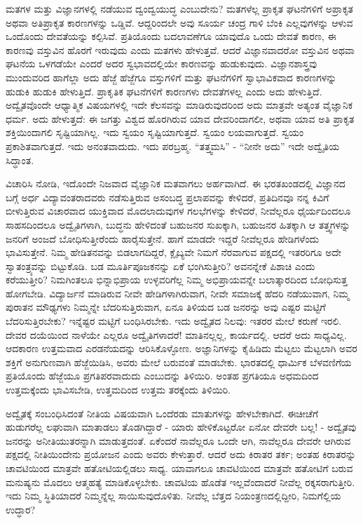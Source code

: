 ಮತಗಳ ಮತ್ತು ವಿಜ್ಞಾನಗಳಲ್ಲಿ ನಡೆಯುವ ದ್ವಂದ್ವಯುದ್ಧ ಎಂಬುದೇನು? ಮತಗಳೆಲ್ಲ ಪ್ರಾಕೃತ ಘಟನೆಗಳಿಗೆ ಅಪ್ರಾಕೃತ ಅಥವಾ ಅತಿಪ್ರಾಕೃತ ಕಾರಣಗಳನ್ನು ಒಡ್ಡಿವೆ. ಆದ್ದರಿಂದಲೇ ಅವು ಸೂರ್ಯ ಚಂದ್ರ ಗಾಳಿ ಬೆಂಕಿ ಎಲ್ಲವುಗಳನ್ನು ಆಳುವ ಒಂದೊಂದು ದೇವತೆಯನ್ನು ಕಲ್ಪಿಸಿವೆ. ಪ್ರತಿಯೊಂದು ಬದಲಾವಣೆಗೂ ಯಾವುದೊ ಒಂದು ದೇವತೆ ಕಾರಣ, ಈ ಕಾರಣವು ವಸ್ತುವಿನ ಹೊರಗೆ ಇರುವುದು ಎಂದು ಮತಗಳು ಹೇಳುತ್ತವೆ. ಆದರೆ ವಿಜ್ಞಾನವಾದರೋ ವಸ್ತುವಿನ ಅಥವಾ ಘಟನೆಯ ಒಳಗಡೆಯೇ ಎಂದರೆ ಅದರ ಸ್ವಭಾವದಲ್ಲಿಯೇ ಕಾರಣವನ್ನು ಹುಡುಕುವುದು. ವಿಜ್ಞಾನಶಾಸ್ತ್ರವು ಮುಂದುವರಿದ ಹಾಗೆಲ್ಲಾ ಅದು ಹೆಜ್ಜೆ ಹೆಜ್ಜೆಗೂ ವಸ್ತುಗಳಿಗೆ ಮತ್ತು ಘಟನೆಗಳಿಗೆ ಸ್ವಾಭಾವಿಕವಾದ ಕಾರಣಗಳನ್ನು ಹುಡುಕಿ ಹುಡುಕಿ ಹೇಳುತ್ತಿದೆ. ಪ್ರಾಕೃತಿಕ ಘಟನೆಗಳಿಗೆ ಕಾರಣಗಳು ದೇವತೆಗಳಲ್ಲ ಎಂದು ಅದು ಹೇಳುತ್ತಿದೆ. ಅದ್ವೈತವೊಂದೇ ಆಧ್ಯಾತ್ಮಿಕ ವಿಷಯಗಳಲ್ಲಿ ಇದೇ ಕೆಲಸವನ್ನು ಮಾಡಿರುವುದರಿಂದ ಅದು ಮಾತ್ರವೇ ಅತ್ಯಂತ ವೈಜ್ಞಾನಿಕ ಧರ್ಮ. ಅದು ಹೇಳುತ್ತದೆ: ಈ ಜಗತ್ತು ವಿಶ್ವದ ಹೊರಗಿರುವ ಯಾವ ದೇವರಿಂದಾಗಲೀ, ಅಥವಾ ಯಾವ ಅತಿ ಪ್ರಾಕೃತ ಶಕ್ತಿಯಿಂದಾಗಲಿ ಸೃಷ್ಟಿಯಾಗಿಲ್ಲ. ಇದು ಸ್ವಯಂ ಸೃಷ್ಟಿಯಾಗುತ್ತದೆ. ಸ್ವಯಂ ಲಯವಾಗುತ್ತದೆ. ಸ್ವಯಂ ಪ್ರಕಾಶಿತವಾಗುತ್ತದೆ. ಇದು ಅನಂತವಾದುದು. ಇದು ಪರಬ್ರಹ್ಮ. “ತತ್ತ್ವಮಸಿ” - “ನೀನೇ ಅದು” ಇದೇ ಅದ್ವೈತಿಯ ಸಿದ್ಧಾಂತ.

ವಿಚಾರಿಸಿ ನೋಡಿ, ಇದೊಂದೇ ನಿಜವಾದ ವೈಜ್ಞಾನಿಕ ಮತವಾಗಲು ಅರ್ಹವಾಗಿದೆ. ಈ ಭರತಖಂಡದಲ್ಲಿ ವಿಜ್ಞಾನದ ಬಗ್ಗೆ ಅರ್ಧ ವಿದ್ಯಾವಂತರಾದವರು ನಡೆಸುತ್ತಿರುವ ಅಸಂಬದ್ಧ ಪ್ರಲಾಪವನ್ನು ಕೇಳಿದರೆ, ಪ್ರತಿದಿನವೂ ನನ್ನ ಕಿವಿಗೆ ಬೀಳುತ್ತಿರುವ ವಿಚಾರವಾದ ಯುಕ್ತಿವಾದ ಮೊದಲಾದುವುಗಳ ಗಲಭೆಗಳನ್ನು ಕೇಳಿದರೆ, ನೀವೆಲ್ಲರೂ ಧೈರ್ಯದಿಂದಲೂ ಸಾಹಸದಿಂದಲೂ ಅದ್ವೈತಿಗಳಾಗಿ, ಬುದ್ಧನು ಹೇಳಿದಂತೆ ಬಹುಜನರ ಸುಖಕ್ಕಾಗಿ, ಬಹುಜನರ ಹಿತಕ್ಕಾಗಿ ಆ ತತ್ತ್ವಗಳನ್ನು ಜನರಿಗೆ ಅಂಜದೆ ಬೋಧಿಸುತ್ತೀರೆಂದು ಹಾರೈಸುತ್ತೇನೆ. ಹಾಗೆ ಮಾಡದೇ ಇದ್ದರೆ ನೀವೆಲ್ಲರೂ ಹೇಡಿಗಳೆಂದು ಭಾವಿಸುತ್ತೇನೆ. ನಿಮ್ಮ ಹೇಡಿತನವನ್ನು ಬಿಡಲಾಗದಿದ್ದರೆ, ಕ್ಲೈಬ್ಯವೇ ನಿಮಗೆ ನೆರವಾಗುವ ಪಕ್ಷದಲ್ಲಿ ಇತರರಿಗೂ ಅದೇ ಸ್ವಾತಂತ್ರ್ಯವನ್ನು ಬಿಟ್ಟುಕೊಡಿ. ಬಡ ಮೂರ್ತಿಪೂಜಕನನ್ನು ಏಕೆ ಭಂಗಿಸುತ್ತೀರಿ? ಅವನನ್ನೇಕೆ ಪಿಶಾಚಿ ಎಂದು ಕರೆಯುತ್ತೀರಿ? ನಿಮಗಿಂತಲೂ ಭಿನ್ನಾಭಿಪ್ರಾಯ ಉಳ್ಳವರಿಗೆಲ್ಲ ನಿಮ್ಮ ಅಭಿಪ್ರಾಯವನ್ನೇ ಬಲಾತ್ಕಾರದಿಂದ ಬೋಧಿಸುತ್ತ ಹೋಗಬೇಡಿ. ವಿದ್ಯಾರ್ಜನೆ ಮಾಡಿರುವ ನೀವೇ ಹೇಡಿಗಳಾಗಿರುವಾಗ, ನೀವೇ ಸಮಾಜಕ್ಕೆ ಹೆದರಿ ನಡೆಯುವಾಗ, ನಿಮ್ಮ ಪುರಾತನ ಮೌಢ್ಯಗಳು ನಿಮ್ಮನ್ನೇ ಬೆದರಿಸುತ್ತಿರುವಾಗ, ಏನೂ ತಿಳಿಯದ ಬಡ ಜನರನ್ನು ಅವು ಎಷ್ಟರ ಮಟ್ಟಿಗೆ ಬೆದರಿಸುತ್ತಿರಬೇಕು? ಇನ್ನೆಷ್ಟರ ಮಟ್ಟಿಗೆ ಬಂಧಿಸಿರಬೇಕು. ಇದು ಅದ್ವೈತದ ನಿಲವು: ಇತರರ ಮೇಲೆ ಕರುಣೆ ಇರಲಿ. ದೇವರ ದಯೆಯಿಂದ ನಾಳೆಯೇ ಎಲ್ಲರೂ ಅದ್ವೈತಿಗಳಾದರೆ! ಮಾತಿನಲ್ಲಲ್ಲ, ಕಾರ್ಯದಲ್ಲಿ. ಆದರೆ ಅದು ಸಾಧ್ಯವಿಲ್ಲ. ಆದಕಾರಣ ಉತ್ತಮವಾದ ಎರಡನೆಯದನ್ನು ಆರಿಸಿಕೊಳ್ಳೋಣ. ಅಜ್ಞಾನಿಗಳನ್ನು ಕೈಹಿಡಿದು ಮೆಟ್ಟಲು ಮೆಟ್ಟಲಾಗಿ ಅವರ ಶಕ್ತಿಗೆ ಅನುಗುಣವಾಗಿ ಹೆಜ್ಜೆಯಿಡಿಸಿ, ಅವರು ಮೇಲೆ ಬರುವಂತೆ ಮಾಡಬೇಕು. ಭಾರತದಲ್ಲಿ ಧಾರ್ಮಿಕ ಬೆಳವಣಿಗೆಯ ಪ್ರತಿಯೊಂದು ಹೆಜ್ಜೆಯೂ ಪ್ರಗತಿಪರವಾದುದು ಎಂಬುದನ್ನು ತಿಳಿಯಿರಿ. ಅಂತಹ ಪ್ರಗತಿಯೂ ಅಧಮದಿಂದ ಉತ್ತಮಕ್ಕೆಂದು ಭಾವಿಸಬೇಡಿ, ಉತ್ತಮದಿಂದ ಉತ್ತಮ ತರಕ್ಕೆಂದು ತಿಳಿಯಿರಿ.

ಅದ್ವೈತಕ್ಕೆ ಸಂಬಂಧಿಸಿದಂತೆ ನೀತಿಯ ವಿಷಯವಾಗಿ ಒಂದೆರಡು ಮಾತುಗಳನ್ನು ಹೇಳಬೇಕಾಗಿದೆ. ಈಚೀಚೆಗೆ ಹುಡುಗರೆಲ್ಲ ಲಘುವಾಗಿ ಮಾತಾಡಲು ತೊಡಗಿದ್ದಾರೆ - ಯಾರು ಹೇಳಿಕೊಟ್ಟರೋ ಏನೋ ದೇವರೇ ಬಲ್ಲ! - ಅದ್ವೈತವು ಜನರನ್ನು ಅನೀತಿಯುತರನ್ನಾಗಿ ಮಾಡುತ್ತದಂತೆ. ಏಕೆಂದರೆ ನಾವೆಲ್ಲರೂ ಒಂದೇ ಆಗಿ, ನಾವೆಲ್ಲರೂ ದೇವರೇ ಆಗಿರುವ ಪಕ್ಷದಲ್ಲಿ ನೀತಿಯಿಂದೇನು ಪ್ರಯೋಜನ ಎಂದು ಅವರು ಕೇಳುತ್ತಾರೆ. ಆದರೆ ಅದು ಕಿರಾತರ ತರ್ಕ; ಅಂತಹ ಕಿರಾತರನ್ನು ಚಾವಟಿಯಿಂದ ಮಾತ್ರವೇ ಹತೋಟಿಯಲ್ಲಿಡಲು ಸಾಧ್ಯ. ಯಾವಾಗಲೂ ಚಾವಟಿಯಿಂದ ಮಾತ್ರವೇ ಹತೋಟಿಗೆ ಬರುವ ಮನುಷ್ಯನು ಮೊದಲು ಆತ್ಮಹತ್ಯೆ ಮಾಡಿಕೊಳ್ಳಬೇಕು. ಚಾವಟಿಯ ಹೊಡೆತ ಇಲ್ಲವೆಂದಾದರೆ ನೀವೆಲ್ಲ ರಕ್ಕಸರಾಗುತ್ತೀರಿ. ಇದು ನಿಮ್ಮ ಸ್ಥಿತಿಯಾದರೆ ನಿಮ್ಮನ್ನೆಲ್ಲ ಸಾಯಿಸುವುದೊಳಿತು. ನೀವೆಲ್ಲ ಬೆತ್ತದ ನಿಯಂತ್ರಣದಲ್ಲಿದ್ದೀರಿ, ನಿಮಗೆಲ್ಲಿಯ ಉದ್ಧಾರ?

